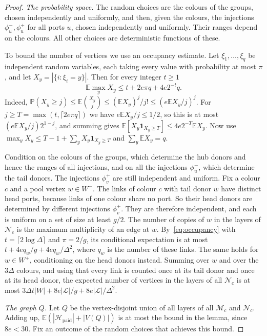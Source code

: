 \documentclass[11pt]{article}
\theoremstyle{definition}
\theoremstyle{remark}
\numberwithin{equation}{section}
\numberwithin{figure}{section}
\numberwithin{table}{section}
\newcommand{\E}{\mathbb{E}}
\renewcommand{\Pr}{\mathbb{P}}
\newcommand{\cH}{\mathcal{H}}
\newcommand{\cL}{\mathcal{L}}
\newcommand{\cM}{\mathcal{M}}
\newcommand{\cN}{\mathcal{N}}
\newcommand{\paid}{\mathrm{paid}}
\begin{document}
\begin{proof}
\emph{The probability space.} The random choices are the colours of the groups,
chosen independently and uniformly, and then, given the colours, the injections
$\phi^-_u,\phi^+_u$ for all ports $u$, chosen independently and uniformly. Their
ranges depend on the colours. All other choices are deterministic functions of
these.

To bound the number of vertices we use an occupancy estimate. Let
$\xi_1,\dots,\xi_q$ be independent random variables, each taking every value
with probability at most $\pi$, and let $X_y=|\{i:\xi_i=y\}|$. Then for every
integer $t\ge1$
\begin{equation}\label{eq:occupancy}
\E\max_yX_y\le t+2e\pi q+4e2^{-t}q.
\end{equation}
Indeed, $\Pr(X_y\ge j)\le\E\binom{X_y}{j}\le(\E X_y)^j/j!\le(e\E X_y/j)^j$.
For $j\ge T=\max(t,\lceil2e\pi q\rceil)$ we have $e\E X_y/j\le1/2$, so this is
at most $(e\E X_y/j)2^{1-j}$, and summing gives
$\E[X_y\mathbf 1_{X_y\ge T}]\le4e2^{-T}\E X_y$. Now use
$\max_yX_y\le T-1+\sum_yX_y\mathbf1_{X_y\ge T}$ and $\sum_y\E X_y=q$.

Condition on the colours of the groups, which determine the hub donors and
hence the ranges of all injections, and on all the injections $\phi^-_u$,
which determine the tail donors. The injections $\phi^+_v$ are still
independent and uniform. Fix a colour $c$ and a pool vertex $w\in W^-$.
The links of colour $c$ with tail donor $w$ have distinct head ports,
because links of one colour share no port. So their head donors are
determined by different injections $\phi^+_v$. They are therefore independent,
and each is uniform on a set of size at least $g/2$. The number of copies of
$w$ in the layers of $\cN_c$ is the maximum multiplicity of an edge at
$w$. By~\eqref{eq:occupancy} with $t=\lceil2\log\Delta\rceil$ and $\pi=2/g$, its
conditional expectation is at most $t+4eq_w/g+4eq_w/\Delta^2$, where $q_w$ is
the number of these links. The same holds for $w\in W^+$, conditioning on the
head donors instead. Summing over $w$ and over the $3\Delta$ colours, and
using that every link is counted once at its tail donor and once at its head
donor, the expected number of vertices in the layers of all $\cN_c$ is
at most $3\Delta t|W|+8e|\cL|/g+8e|\cL|/\Delta^2$.

\emph{The graph $Q$.} Let $Q$ be the vertex-disjoint union of all layers of all
$\cM_c$ and $\cN_c$. Adding up, $\E(|\cH_\paid|+|V(Q)|)$ is at most
the bound in the lemma, since $8e<30$. Fix an outcome of the
random choices that achieves this bound.


\end{proof}
\end{document}
